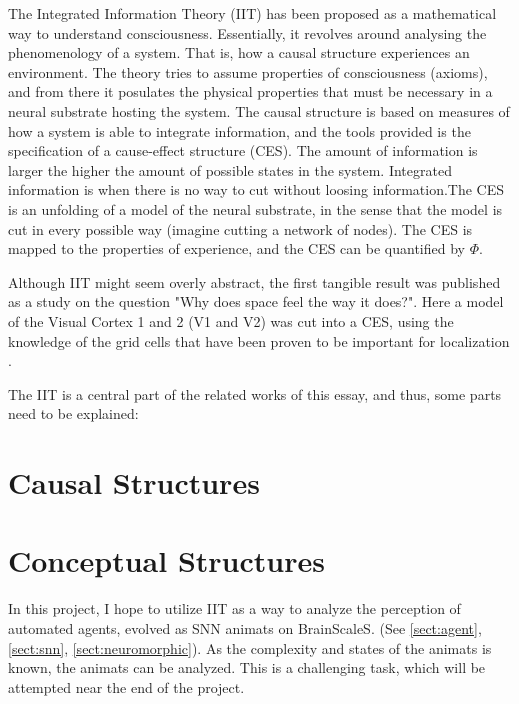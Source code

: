 The Integrated Information Theory (IIT) has been proposed as a mathematical way to understand consciousness.
Essentially, it revolves around analysing the phenomenology of a system.
That is, how a causal structure experiences an environment.
The theory tries to assume properties of consciousness (axioms), and from there it posulates the physical properties that must be necessary in a neural substrate hosting the system.
The causal structure is based on measures of how a system is able to integrate information, and the tools provided is the specification of a cause-effect structure (CES).
The amount of information is larger the higher the amount of possible states in the system. Integrated information is when there is no way to cut without loosing information.The CES is an unfolding of a model of the neural substrate, in the sense that the model is cut in every possible way (imagine cutting a network of nodes).
The CES is mapped to the properties of experience, and the CES can be quantified by $\Phi$. \cite{oizumi_phenomenology_2014}

Although IIT might seem overly abstract, the first tangible result was published as a study on the question "Why does space feel the way it does?".
Here a model of the Visual Cortex 1 and 2 (V1 and V2) was cut into a CES, using the knowledge of the grid cells that have been proven to be important for localization \cite{haun_why_2019}.

The IIT is a central part of the related works of this essay, and thus, some parts need to be explained:
\section{Causal Structures}
\section{Conceptual Structures}

In this project, I hope to utilize IIT as a way to analyze the perception of automated agents, evolved as SNN animats on BrainScaleS. (See \vref{sect:agent}, \vref{sect:snn}, \vref{sect:neuromorphic}).
As the complexity and states of the animats is known, the animats can be analyzed.
This is a challenging task, which will be attempted near the end of the project.
